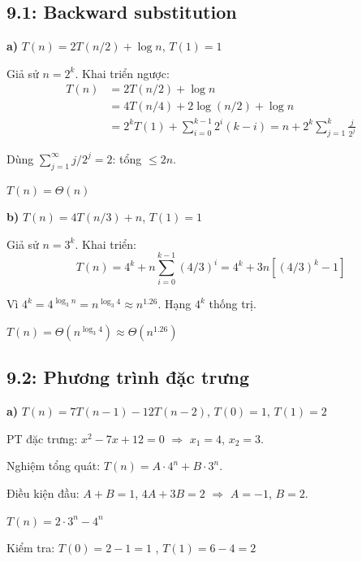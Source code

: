 \documentclass[12pt,a4paper]{article}
\begin{document}
\subsection{9.1: Backward substitution}

\textbf{a)} $T(n) = 2T(n/2) + \log n$, $T(1) = 1$

Giả sử $n = 2^k$. Khai triển ngược:
\begin{align*}
  T(n) &= 2T(n/2) + \log n \\
       &= 4T(n/4) + 2\log(n/2) + \log n \\
       &= 2^k T(1) + \sum_{i=0}^{k-1} 2^i(k-i) = n + 2^k\sum_{j=1}^{k}\frac{j}{2^j}
\end{align*}

Dùng $\sum_{j=1}^{\infty} j/2^j = 2$: tổng $\leq 2n$.

\begin{resultbox}
$T(n) = \Theta(n)$
\end{resultbox}

\bigskip

\textbf{b)} $T(n) = 4T(n/3) + n$, $T(1) = 1$

Giả sử $n = 3^k$. Khai triển:
\[
  T(n) = 4^k + n\sum_{i=0}^{k-1}(4/3)^i = 4^k + 3n[(4/3)^k - 1]
\]

Vì $4^k = 4^{\log_3 n} = n^{\log_3 4} \approx n^{1.26}$. Hạng $4^k$ thống trị.

\begin{resultbox}
$T(n) = \Theta(n^{\log_3 4}) \approx \Theta(n^{1.26})$
\end{resultbox}

\subsection{9.2: Phương trình đặc trưng}

\textbf{a)} $T(n) = 7T(n-1) - 12T(n-2)$, $T(0) = 1$, $T(1) = 2$

PT đặc trưng: $x^2 - 7x + 12 = 0$ $\Rightarrow$ $x_1 = 4$, $x_2 = 3$.

Nghiệm tổng quát: $T(n) = A \cdot 4^n + B \cdot 3^n$.

Điều kiện đầu: $A + B = 1$, $4A + 3B = 2$ $\Rightarrow$ $A = -1$, $B = 2$.

\begin{resultbox}
$T(n) = 2 \cdot 3^n - 4^n$

Kiểm tra: $T(0) = 2 - 1 = 1$ \checkmark, $T(1) = 6 - 4 = 2$ \checkmark
\end{resultbox}

\bigskip
\end{document}
